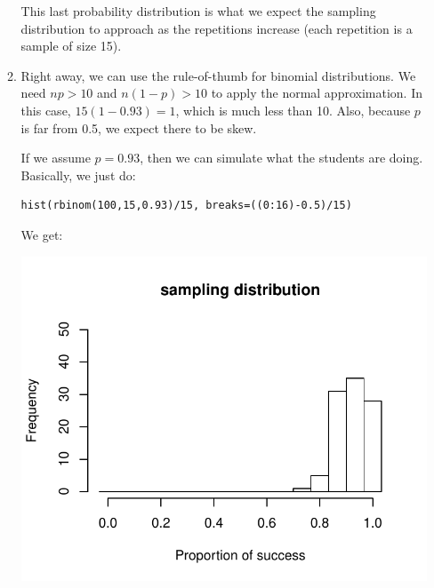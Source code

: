 \documentclass[12pt,letterpaper]{article}
\begin{document}
\begin{enumerate}
\begin{enumerate}
This last probability distribution is what we expect the sampling distribution to approach as the repetitions  increase (each repetition is a sample of size 15).

\item 
Right away, we can use the rule-of-thumb for binomial distributions. We need $np>10$ and $n(1-p)>10$ to apply the normal approximation. In this case, $15(1-0.93) = 1$, which is much less than 10. Also, because $p$ is far from 0.5, we expect there to be skew.

If we assume $p=0.93$, then we can simulate what the students are doing. Basically, we just do:
\begin{verbatim}
hist(rbinom(100,15,0.93)/15, breaks=((0:16)-0.5)/15)
\end{verbatim}
We get:
\begin{center}
\includegraphics[scale=0.8]{code/art.pdf}
\end{center}


\end{enumerate}
\end{enumerate}
\end{document}
